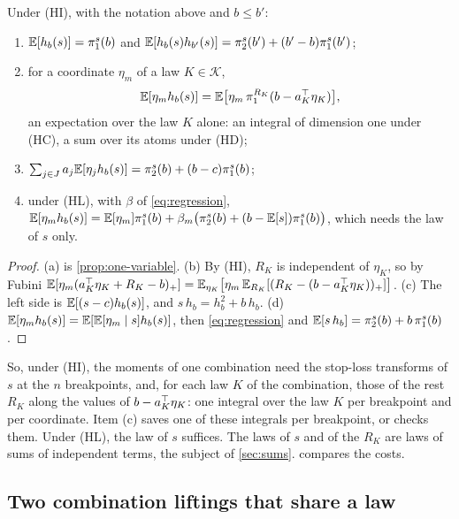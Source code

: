 \documentclass[11pt,a4paper]{article}
\numberwithin{equation}{section}
\newcommand{\pos}[1]{(#1)_+}            %
\newcommand{\hinge}[1]{h_{#1}}          %
\newcommand{\slt}[2]{\pi^{#1}_{#2}}      %
\newcommand{\Hyp}[1]{\textup{(H#1)}}    %
\begin{document}
\begin{proposition}
\label{prop:one-combination}
Under \Hyp{I}, with the notation above and $b \le b'$:
\begin{enumerate}[label=(\alph*),nosep]
\item $\E[\hinge b(s)] = \slt s1(b)$ and $\E[\hinge b(s)\hinge{b'}(s)] = \slt s2(b') + (b' - b)\slt s1(b')$;
\item for a coordinate $\eta_m$ of a law $K \in \mathcal{K}$,
\[
\E[\eta_m\hinge b(s)] = \E\bigl[\eta_m\,\slt{R_K}1(b - a_K^\T\eta_K)\bigr],
\]
an expectation over the law $K$ alone: an integral of dimension one under \Hyp{C}, a sum over its atoms under \Hyp{D};
\item $\sum_{j \in J} a_j\E[\eta_j\hinge b(s)] = \slt s2(b) + (b - c)\slt s1(b)$;
\item under \Hyp{L}, with $\beta$ of \eqref{eq:regression},
$\E[\eta_m\hinge b(s)] = \E[\eta_m]\slt s1(b) + \beta_m\bigl(\slt s2(b) + (b - \E[s])\slt s1(b)\bigr)$,
which needs the law of $s$ only.
\end{enumerate}
\end{proposition}

\begin{proof}
(a) is \cref{prop:one-variable}.
(b) By \Hyp{I}, $R_K$ is independent of $\eta_K$, so by Fubini
$\E[\eta_m\pos{a_K^\T\eta_K + R_K - b}] = \E_{\eta_K}\bigl[\eta_m\,\E_{R_K}[\pos{R_K - (b - a_K^\T\eta_K)}]\bigr]$.
(c) The left side is $\E[(s - c)\hinge b(s)]$, and $s\,\hinge b = \hinge b^2 + b\,\hinge b$.
(d) $\E[\eta_m\hinge b(s)] = \E[\E[\eta_m \mid s]\hinge b(s)]$, then \eqref{eq:regression} and $\E[s\,\hinge b] = \slt s2(b) + b\,\slt s1(b)$.
\end{proof}

So, under \Hyp{I}, the moments of one combination need
the stop-loss transforms of $s$ at the $n$ breakpoints,
and, for each law $K$ of the combination, those of the rest $R_K$ along the values of $b - a_K^\top\eta_K$: one integral over the law $K$ per breakpoint and per coordinate.
Item (c) saves one of these integrals per breakpoint, or checks them.
Under \Hyp{L}, the law of $s$ suffices.
The laws of $s$ and of the $R_K$ are laws of sums of independent terms, the subject of \cref{sec:sums}.
 compares the costs.

\subsection{Two combination liftings that share a law}
\label{sec:two-combinations}
\end{document}
